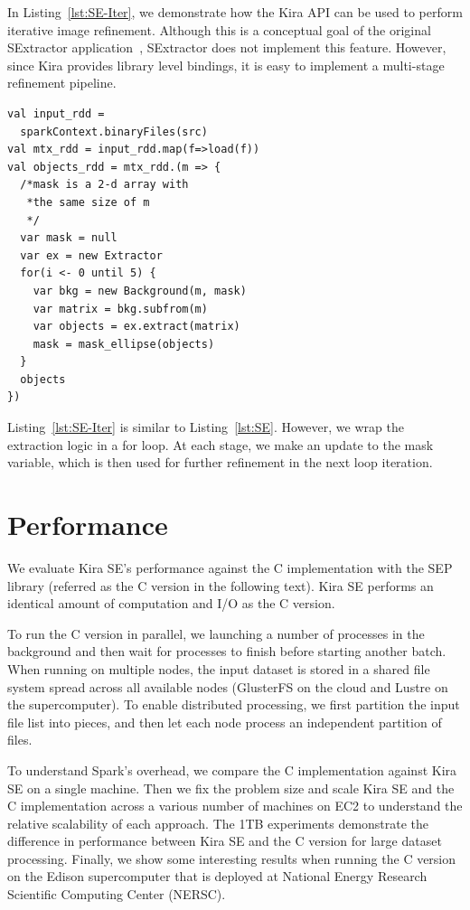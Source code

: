 \documentclass[10pt, conference, compsocconf]{IEEEtran}
\begin{document}
In Listing~\ref{lst:SE-Iter}, we demonstrate how the Kira API can be used to perform
iterative image refinement. Although this is a conceptual goal of the original SExtractor
application~\cite{bertin96}, SExtractor does not implement this feature. However, since Kira provides
library level bindings, it is easy to implement a multi-stage refinement pipeline.

\begin{lstlisting}[caption=Iterative Objects Extraction Logic, label=lst:SE-Iter, linewidth=0.5\textwidth, xleftmargin=2.5ex]
val input_rdd = 
  sparkContext.binaryFiles(src)
val mtx_rdd = input_rdd.map(f=>load(f))
val objects_rdd = mtx_rdd.(m => {
  /*mask is a 2-d array with 
   *the same size of m
   */
  var mask = null
  var ex = new Extractor   
  for(i <- 0 until 5) {
    var bkg = new Background(m, mask)
    var matrix = bkg.subfrom(m) 
    var objects = ex.extract(matrix)
    mask = mask_ellipse(objects)  
  }
  objects
})
\end{lstlisting}

Listing~\ref{lst:SE-Iter} is similar to Listing~\ref{lst:SE}. However, we wrap the
extraction logic in a for loop. At each stage, we make an update to the mask variable, which
is then used for further refinement in the next loop iteration.

\section{Performance}
\label{sec:Performance}

We evaluate Kira SE's performance against the C implementation with the SEP library
(referred as the C version in the following text). Kira SE performs an identical amount of
computation and I/O as the C version.

To run the C version in parallel, we launching a number of processes in the background and then wait
for processes to finish before starting another batch. When running on multiple nodes,
the input dataset is stored in a shared file system spread across all available nodes
(GlusterFS on the cloud and Lustre on the supercomputer). To enable distributed processing,
we first partition the input file list into pieces, and then let each node process an
independent partition of files.

To understand Spark's overhead, we compare the C implementation against Kira SE on a single
machine. Then we fix the problem size and scale Kira SE and the C implementation across a
various number of machines on EC2 to understand the relative scalability of each approach.
The 1TB experiments demonstrate the difference in performance between Kira SE and the C version
for large dataset processing. Finally, we show some interesting results when running the C
version on the Edison supercomputer that is deployed at National Energy Research Scientific Computing Center (NERSC).
\end{document}
